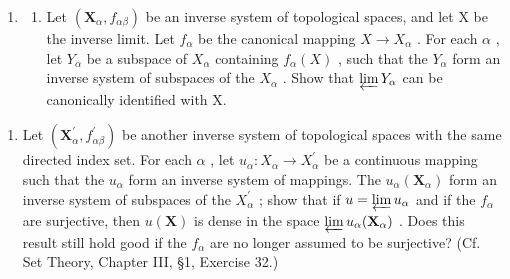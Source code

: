 \begin{enumerate}
\def\labelenumi{\arabic{enumi})}
\setcounter{enumi}{9}
\tightlist
\item
  \begin{enumerate}
  \def\labelenumii{\alph{enumii})}
  \tightlist
  \item
    Let \((\mathbf{X}_{\alpha}, f_{\alpha\beta})\) be an inverse system of topological spaces, and let X be the inverse limit. Let \(f_{\alpha}\) be the canonical mapping \(X \to X_{\alpha}\) . For each \(\alpha\) , let \(Y_{\alpha}\) be a subspace of \(X_{\alpha}\) containing \(f_{\alpha}(X)\) , such that the \(Y_{\alpha}\) form an inverse system of subspaces of the \(X_{\alpha}\) . Show that \(\varprojlim Y_{\alpha}\) can be canonically identified with X.
  \end{enumerate}
\end{enumerate}

\begin{enumerate}
\def\labelenumi{\alph{enumi})}
\setcounter{enumi}{1}
\tightlist
\item
  Let \((\mathbf{X}_{\alpha}^{\prime}, f_{\alpha\beta}^{\prime})\) be another inverse system of topological spaces with the same directed index set. For each \(\alpha\) , let \(u_{\alpha}: X_{\alpha} \to X_{\alpha}^{\prime}\) be a continuous mapping such that the \(u_{\alpha}\) form an inverse system of mappings. The \(u_{\alpha}(\mathbf{X}_{\alpha})\) form an inverse system of subspaces of the \(X_{\alpha}^{\prime}\) ; show that if \(u = \varprojlim u_{\alpha}\) and if the \(f_{\alpha}\) are surjective, then \(u(\mathbf{X})\) is dense in the space \(\varprojlim u_{\alpha}(\mathbf{X}_{\alpha})\) . Does this result still hold good if the \(f_{\alpha}\) are no longer assumed to be surjective? (Cf. Set Theory, Chapter III, §1, Exercise 32.)
\end{enumerate}

